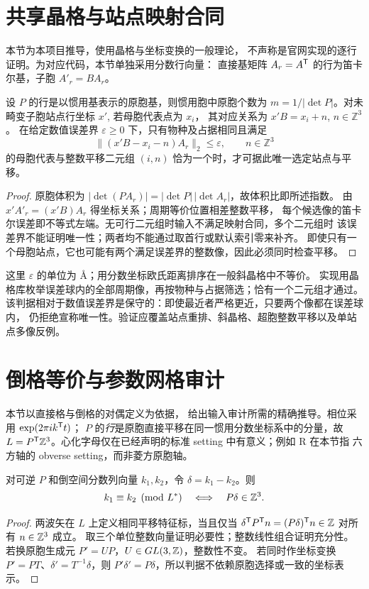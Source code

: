 \section{共享晶格与站点映射合同}\label{sec:shared-mapping}
本节为本项目推导，使用晶格与坐标变换的一般理论\citep{ITCGeometry,ITA}，
不声称是官网实现的逐行证明。为对应代码，本节单独采用分数行向量：
直接基矩阵 $A_r=A^\mathsf T$ 的行为笛卡尔基，子胞 $A'_r=BA_r$。

\begin{proposition}[心化指数与唯一站点对应]
设 $P$ 的行是以惯用基表示的原胞基，则惯用胞中原胞个数为
$m=1/|\det P|$。对未畸变子胞站点行坐标 $x'$, 若母胞代表点为 $x_i$，
其对应关系为 $x'B=x_i+n$, $n\in\mathbb Z^3$。
在给定数值误差界 $\varepsilon\geq0$ 下，只有物种及占据相同且满足
\[
 \|(x'B-x_i-n)A_r\|_2\leq\varepsilon,\qquad n\in\mathbb Z^3
\]
的母胞代表与整数平移二元组 $(i,n)$ 恰为一个时，才可据此唯一选定站点与平移。
\end{proposition}
\begin{proof}
原胞体积为 $|\det(PA_r)|=|\det P|\,|\det A_r|$，故体积比即所述指数。
由 $x'A'_r=(x'B)A_r$ 得坐标关系；周期等价位置相差整数平移，
每个候选像的笛卡尔误差即不等式左端。无可行二元组时输入不满足映射合同，多个二元组时
该误差界不能证明唯一性；两者均不能通过取首行或默认索引零来补齐。
即使只有一个母胞站点，它也可能有两个满足误差界的整数像，因此必须同时检查平移。
\end{proof}
这里 $\varepsilon$ 的单位为 \AA；用分数坐标欧氏距离排序在一般斜晶格中不等价。
实现用晶格库枚举误差球内的全部周期像，再按物种与占据筛选；恰有一个二元组才通过。
该判据相对于数值误差界是保守的：即使最近者严格更近，只要两个像都在误差球内，
仍拒绝宣称唯一性。验证应覆盖站点重排、斜晶格、超胞整数平移以及单站点多像反例。

\section{倒格等价与参数网格审计}\label{sec:grid-duality}
本节以直接格与倒格的对偶定义为依据\citep{ReciprocalIUCr,ITCGeometry,ITA}，
给出输入审计所需的精确推导。相位采用 $\exp(2\pi i k^\mathsf T t)$；
$P$ 的\emph{行}是原胞直接平移在同一惯用分数坐标系中的分量，故
$L=P^\mathsf T\mathbb Z^3$。心化字母仅在已经声明的标准 setting 中有意义；例如 R 在本节指
六方轴的 obverse setting，而非菱方原胞轴。

\begin{theorem}[包含心化平移的倒格等价]
对可逆 $P$ 和倒空间分数列向量 $k_1,k_2$，令 $\delta=k_1-k_2$。则
\[
 k_1\equiv k_2\pmod{L^*}\quad\Longleftrightarrow\quad P\delta\in\mathbb Z^3.
\]
\end{theorem}
\begin{proof}
两波矢在 $L$ 上定义相同平移特征标，当且仅当
$\delta^\mathsf T P^\mathsf T n=(P\delta)^\mathsf T n\in\mathbb Z$ 对所有 $n\in\mathbb Z^3$ 成立。
取三个单位整数向量证明必要性；整数线性组合证明充分性。
若换原胞生成元 $P'=UP$，$U\in GL(3,\mathbb Z)$，整数性不变。
若同时作坐标变换 $P'=PT$、$\delta'=T^{-1}\delta$，则
$P'\delta'=P\delta$，所以判据不依赖原胞选择或一致的坐标表示。
\end{proof}

